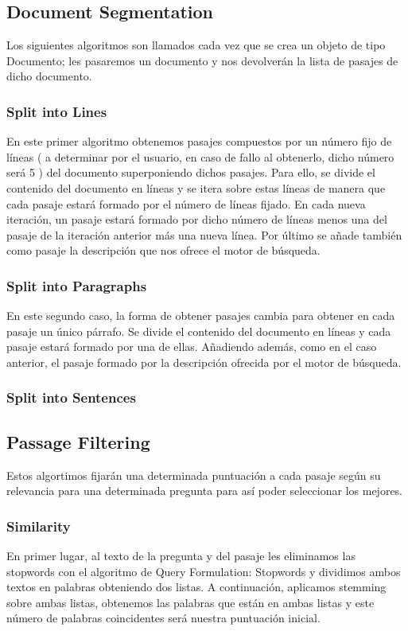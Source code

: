 \documentclass[12pt,a4paper,titlepage]{article}
\begin{document}
\subsection{Document Segmentation}
Los siguientes algoritmos son llamados cada vez que se crea un objeto de tipo Documento; les pasaremos un documento y nos devolverán la lista de pasajes de dicho documento.

\subsubsection{Split into Lines}
En este primer algoritmo obtenemos pasajes compuestos por un número fijo de líneas ( a determinar por el usuario, en caso de fallo al obtenerlo, dicho número será 5 ) del documento superponiendo dichos pasajes. Para ello, se divide el contenido del documento en líneas y se itera sobre estas líneas de manera que cada pasaje estará formado por el número de líneas fijado. En cada nueva iteración, un pasaje estará formado por dicho número de líneas menos una del pasaje de la iteración anterior más una nueva línea. Por último se añade también como pasaje la descripción que nos ofrece el motor de búsqueda.

\subsubsection{Split into Paragraphs}
En este segundo caso, la forma de obtener pasajes cambia para obtener en cada pasaje un único párrafo. Se divide el contenido del documento en líneas y cada pasaje estará formado por una de ellas. Añadiendo además, como en el caso anterior, el pasaje formado por la descripción ofrecida por el motor de búsqueda.

\subsubsection{Split into Sentences}

\subsection{Passage Filtering}
Estos algortimos fijarán una determinada puntuación a cada pasaje según su relevancia para una determinada pregunta para así poder seleccionar los mejores.

\subsubsection{Similarity}
En primer lugar, al texto de la pregunta y del pasaje les eliminamos las stopwords con el algoritmo de Query Formulation: Stopwords y dividimos ambos textos en palabras obteniendo dos listas. A continuación, aplicamos stemming sobre ambas listas, obtenemos las palabras que están en ambas listas y este número de palabras coincidentes será nuestra puntuación inicial.
\end{document}
